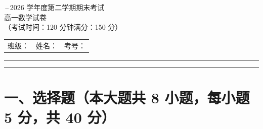 \documentclass[zihao=-4,a4paper]{ctexart}
\begin{document}
\thispagestyle{plain}
\begin{center}
  {\,--\,2026 学年度第二学期期末考试}\\[0.6em]
  {\heiti 高一数学试卷}\\[0.8em]
  {（考试时间：120 分钟\quad 满分：150 分）}
\end{center}

\vspace{0.4em}
\noindent
\begin{tabular}{@{}p{}p{}p{}@{}}
  班级：\underline{\hspace{2.4cm}} &
  姓名：\underline{\hspace{2.4cm}} &
  考号：\underline{\hspace{2.4cm}} \\
\end{tabular}

\vspace{0.3em}
\noindent\rule{\textwidth}{0.4pt}
\noindent\rule{\textwidth}{0.4pt}

\section*{一、选择题（本大题共 8 小题，每小题 5 分，共 40 分）}
\end{document}
